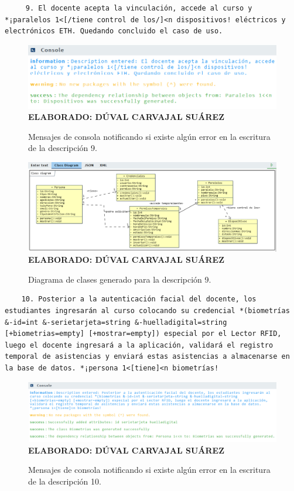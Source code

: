 \begin{lstlisting}
	 9. El docente acepta la vinculación, accede al curso y  *¡paralelos 1<[/tiene control de los/]<n dispositivos! eléctricos y electrónicos ETH. Quedando concluido el caso de uso.
\end{lstlisting}

     \begin{figure}[h!]
	\caption{Mensajes de consola notificando si existe algún error en la escritura de la descripción 9.}
	\includegraphics[width=14cm]{img/not-eva-009.png}
	\label{fig:not_eva_009}
	\textbf{\\ ELABORADO: DÚVAL CARVAJAL SUÁREZ}
\end{figure}

\begin{figure}[H]
	\caption{Diagrama de clases generado para la descripción 9.}
	\includegraphics[width=15cm]{img/dc-eva-009.png}
	\label{fig:dc_eva_009}
	\textbf{\\ ELABORADO: DÚVAL CARVAJAL SUÁREZ}
\end{figure}

\begin{lstlisting}
	10. Posterior a la autenticación facial del docente, los estudiantes ingresarán al curso colocando su credencial *(biometrías &-id=int &-serietarjeta=string &-huelladigital=string [+biometrias=empty] [+mostrar=empty]) especial por el Lector RFID, luego el docente ingresará a la aplicación, validará el registro temporal de asistencias y enviará estas asistencias a almacenarse en la base de datos. *¡persona 1<[tiene]<n biometrías!
\end{lstlisting}

     \begin{figure}[h!]
	\caption{Mensajes de consola notificando si existe algún error en la escritura de la descripción 10.}
	\includegraphics[width=14cm]{img/not-eva-010.png}
	\label{fig:not_eva_010}
	\textbf{\\ ELABORADO: DÚVAL CARVAJAL SUÁREZ}
\end{figure}

